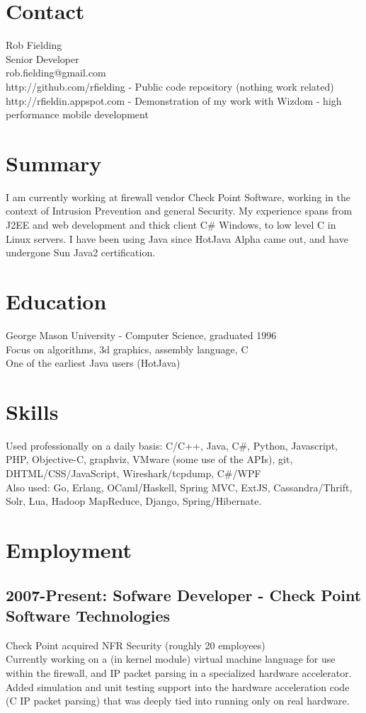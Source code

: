\documentclass[margin]{res}
\begin{document}
\begin{resume}
\section{Contact}
Rob Fielding \\
Senior Developer \\
rob.fielding@gmail.com \\
http://github.com/rfielding - Public code repository (nothing work related) \\
http://rfieldin.appspot.com - Demonstration of my work with Wizdom - high performance mobile development 

\section{Summary}
I am currently working at firewall vendor Check Point Software,
working in the context of Intrusion Prevention and general Security.
My experience spans from J2EE and web development and thick client
C\# Windows, to low level C in Linux servers.
I have been using Java since HotJava Alpha came out, and have undergone
Sun Java2 certification.

\section{Education}
George Mason University - Computer Science, graduated 1996 \\
Focus on algorithms, 3d graphics, assembly language, C \\
One of the earliest Java users (HotJava) 

\section{Skills}
Used professionally on a daily basis: C/C++, Java, C\#, Python, Javascript, PHP, Objective-C, graphviz, VMware (some use of the APIs), git, DHTML/CSS/JavaScript, Wireshark/tcpdump, C\#/WPF \\

Also used: Go, Erlang, OCaml/Haskell, Spring MVC, ExtJS, Cassandra/Thrift, Solr, Lua, Hadoop MapReduce, Django, Spring/Hibernate. 

\section{Employment}
\subsection{2007-Present: Sofware Developer - Check Point Software Technologies}
Check Point acquired NFR Security (roughly 20 employees) \\
Currently working on a (in kernel module) virtual machine language for use within the firewall, and IP packet parsing in a specialized hardware accelerator.
Added simulation and unit testing support into the hardware acceleration code (C IP packet parsing) that was deeply tied into running only on real hardware.  \\


\end{resume}
\end{document}
